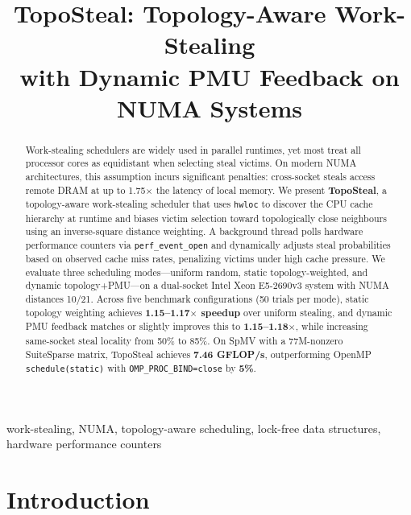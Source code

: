 \documentclass[conference]{IEEEtran}
\begin{document}
\title{TopoSteal: Topology-Aware Work-Stealing\\with Dynamic PMU Feedback on NUMA Systems}

\author{
}

\maketitle

\begin{abstract}
Work-stealing schedulers are widely used in parallel runtimes, yet most treat all processor cores as equidistant when selecting steal victims. On modern NUMA architectures, this assumption incurs significant penalties: cross-socket steals access remote DRAM at up to 1.75$\times$ the latency of local memory. We present \textbf{TopoSteal}, a topology-aware work-stealing scheduler that uses \texttt{hwloc} to discover the CPU cache hierarchy at runtime and biases victim selection toward topologically close neighbours using an inverse-square distance weighting. A background thread polls hardware performance counters via \texttt{perf\_event\_open} and dynamically adjusts steal probabilities based on observed cache miss rates, penalizing victims under high cache pressure. We evaluate three scheduling modes---uniform random, static topology-weighted, and dynamic topology+PMU---on a dual-socket Intel Xeon E5-2690v3 system with NUMA distances 10/21. Across five benchmark configurations (50 trials per mode), static topology weighting achieves \textbf{1.15--1.17$\times$ speedup} over uniform stealing, and dynamic PMU feedback matches or slightly improves this to \textbf{1.15--1.18$\times$}, while increasing same-socket steal locality from 50\% to 85\%. On SpMV with a 77M-nonzero SuiteSparse matrix, TopoSteal achieves \textbf{7.46 GFLOP/s}, outperforming OpenMP \texttt{schedule(static)} with \texttt{OMP\_PROC\_BIND=close} by \textbf{5\%}.
\end{abstract}

\begin{IEEEkeywords}
work-stealing, NUMA, topology-aware scheduling, lock-free data structures, hardware performance counters
\end{IEEEkeywords}

\section{Introduction}
\end{document}
